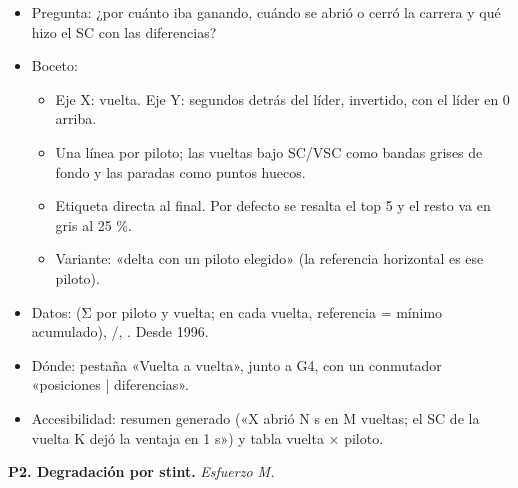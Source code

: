 \begin{itemize}
\item Pregunta: ¿por cuánto iba ganando, cuándo se abrió o cerró la carrera y qué hizo el SC con las diferencias?
\item Boceto:
\begin{itemize}
\item Eje X: vuelta. Eje Y: segundos detrás del líder, invertido, con el líder en 0 arriba.
\item Una línea por piloto; las vueltas bajo SC/VSC como bandas grises de fondo y las paradas como puntos huecos.
\item Etiqueta directa al final. Por defecto se resalta el top 5 y el resto va en gris al 25 \%.
\item Variante: «delta con un piloto elegido» (la referencia horizontal es ese piloto).
\end{itemize}
\item Datos:  (Σ  por piloto y vuelta; en cada vuelta, referencia = mínimo acumulado), /, . Desde 1996.
\item Dónde: pestaña «Vuelta a vuelta», junto a G4, con un conmutador «posiciones | diferencias».
\item Accesibilidad: resumen generado («X abrió N s en M vueltas; el SC de la vuelta K dejó la ventaja en 1 s») y tabla vuelta × piloto.
\end{itemize}

\textbf{P2. Degradación por stint.} \emph{Esfuerzo M.}

